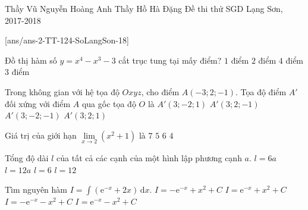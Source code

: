 \begin{name}
{Thầy Vũ Nguyễn Hoàng Anh \newline Thầy Hồ Hà Đặng}
{Đề thi thử SGD Lạng Sơn, 2017-2018}
\end{name}
\setcounter{ex}{0}\setcounter{bt}{0}
[ans/ans-2-TT-124-SoLangSon-18]
\begin{ex}%
Đồ thị hàm số $y=x^4-x^3-3$ cắt trục tung tại mấy điểm?
\choice
{\True $1$ điểm}
{$2$ điểm}
{$4$ điểm}
{$3$ điểm}
\end{ex}

\begin{ex}%
Trong không gian với hệ tọa độ $Oxyz$, cho điểm $A(-3;2;-1)$. Tọa độ điểm $A'$ đối xứng với điểm $A$ qua gốc tọa độ $O$ là
\choice
{\True $A'(3;-2;1)$}
{$A'(3;2;-1)$}
{$A'(3;-2;-1)$}
{$A'(3;2;1)$}
\end{ex}

\begin{ex}%
Giá trị của giới hạn $\lim \limits_{x\to 2} \left( x^2+1 \right)$ là
\choice
{$7$}
{\True $5$}
{$6$}
{$4$}
\end{ex}


\begin{ex}%
Tổng độ dài $l$ của tất cả các cạnh của một hình lập phương cạnh $a$.
\choice
{$l=6a$}
{\True $l=12a$}
{$l=6$}
{$l=12$}
\end{ex}

\begin{ex}%
Tìm nguyên hàm $I=\displaystyle \int \left( \mathrm{e}^{-x}+2x \right)\mathrm{\,d}x$.
\choice
{\True $I=-\mathrm{e}^{-x}+x^2+C$}
{$I=\mathrm{e}^{-x}+x^2+C$}
{$I=-\mathrm{e}^{-x}-x^2+C$}
{$I=\mathrm{e}^{-x}-x^2+C$}
\end{ex}

